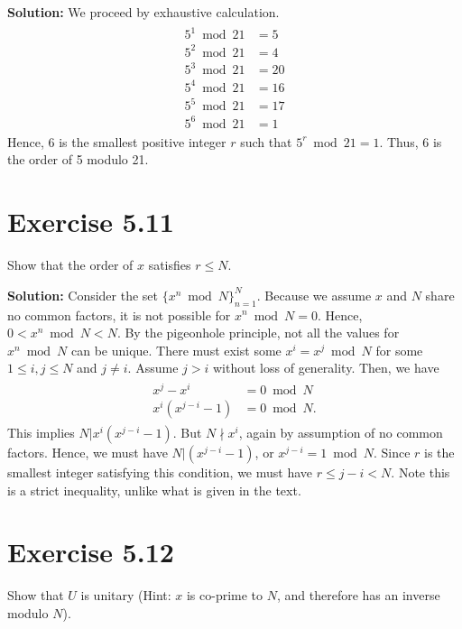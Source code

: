 \documentclass{book}
\begin{document}
    \textbf{Solution:} We proceed by exhaustive calculation.
    \begin{align}
    \begin{aligned}
        5^1 \bmod 21 &= 5 \\
        5^2 \bmod 21 &= 4 \\
        5^3 \bmod 21 &= 20\\
        5^4 \bmod 21 &= 16\\
        5^5 \bmod 21 &= 17\\
        5^6 \bmod 21 &= 1
    \end{aligned}
    \end{align}
    Hence, 6 is the smallest positive integer $r$ such that $5^r \bmod 21 = 1$. Thus, 6 is the order of 5 modulo 21.

\section*{Exercise 5.11}
    Show that the order of $x$ satisfies $r\leq N$.
    
    \textbf{Solution:} Consider the set $\{x^n \bmod N\}_{n=1}^N$. Because we assume $x$ and $N$ share no common factors, it is not possible for $x^n \bmod N = 0$. Hence, $0< x^n \bmod N < N$. By the pigeonhole principle, not all the values for $x^n \bmod N$ can be unique. There must exist some $x^i = x^j \bmod N$ for some $1\leq i,j \leq N$ and $j\neq i$. Assume $j>i$ without loss of generality. Then, we have
    \begin{align}
    \begin{aligned}
        x^j-x^i &= 0 \bmod N \\
        x^i(x^{j-i}-1) &=0 \bmod N.
    \end{aligned}
    \end{align}
    This implies $N|x^i(x^{j-i}-1)$. But $N\nmid x^i$, again by assumption of no common factors. Hence, we must have $N|(x^{j-i}-1)$, or $x^{j-i} = 1 \bmod N$. Since $r$ is the smallest integer satisfying this condition, we must have $r\leq j-i < N$. Note this is a strict inequality, unlike what is given in the text.

\section*{Exercise 5.12}
    Show that $U$ is unitary (Hint: $x$ is co-prime to $N$, and therefore has an inverse modulo $N$).
    
\end{document}
